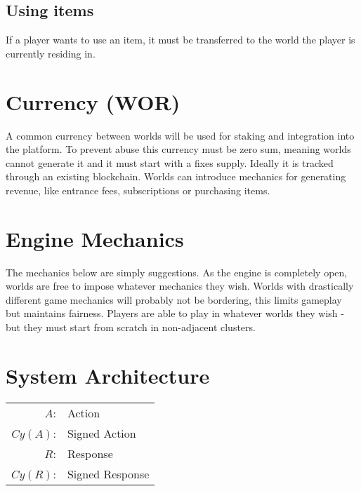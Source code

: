 \documentclass[runningheads,a4paper]{llncs}
\begin{document}
\subsection{Using items}
If a player wants to use an item, it must be transferred to the world the player is currently residing in. 

\section{Currency (WOR)}
\label{money}
A common currency between worlds will be used for staking and integration into the platform. To prevent abuse this currency must be zero sum, meaning worlds cannot generate it and it must start with a fixes supply. Ideally it is tracked through an existing blockchain. Worlds can introduce mechanics for generating revenue, like entrance fees, subscriptions or purchasing items.

\section{Engine Mechanics} 
The mechanics below are simply suggestions. As the engine is completely open, worlds are free to impose whatever mechanics they wish. Worlds with drastically different game mechanics will probably not be bordering, this limits gameplay but maintains fairness. Players are able to play in whatever worlds they wish - but they must start from scratch in non-adjacent clusters.


\section{System Architecture}
\begin{center}
\begin{tabular}{r l}
$A$: & Action\\ 
$Cy(A)$: & Signed Action\\
$R$: & Response\\ 
$Cy(R)$: & Signed Response\\

\end{tabular}
\end{center}
\end{document}
